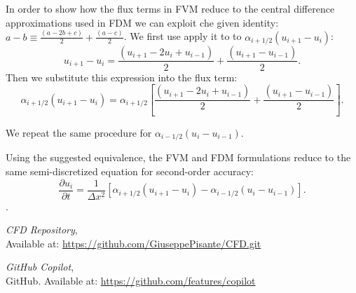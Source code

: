 \documentclass{article}
\begin{document}
In order to show how the flux terms in FVM reduce to the central difference approximations used in FDM we can exploit che given identity: \(a - b \equiv \frac{(a - 2b + c)}{2} + \frac{(a - c)}{2}\).
We first use apply it to to \( \alpha_{i+1/2} (u_{i+1} - u_i) \):
\[
u_{i+1} - u_i = \frac{(u_{i+1} - 2u_i + u_{i-1})}{2} + \frac{(u_{i+1} - u_{i-1})}{2}.
\]
Then we substitute this expression into the flux term:
\[
\alpha_{i+1/2} (u_{i+1} - u_i) = \alpha_{i+1/2} \left[ \frac{(u_{i+1} - 2u_i + u_{i-1})}{2} + \frac{(u_{i+1} - u_{i-1})}{2} \right].
\]

We repeat the same procedure for \( \alpha_{i-1/2} (u_i - u_{i-1}) \).

Using the suggested equivalence, the FVM and FDM formulations reduce to the same semi-discretized equation for second-order accuracy:
\[
\frac{\partial u_i}{\partial t} = \frac{1}{\Delta x^2} \left[ \alpha_{i+1/2} (u_{i+1} - u_i) - \alpha_{i-1/2} (u_i - u_{i-1}) \right].
\].


\begin{thebibliography}{9}
  \textit{CFD Repository},\\
  Available at: \url{https://github.com/GiuseppePisante/CFD.git}
  
  \textit{GitHub Copilot},\\
  GitHub. Available at: \url{https://github.com/features/copilot}
  
\end{thebibliography}
\end{document}
